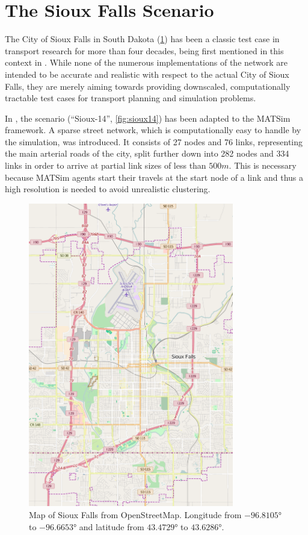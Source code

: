 \section{The Sioux Falls Scenario}
\label{sec:sioux}

The City of Sioux Falls in South Dakota (\cref{fig:original_map}) has been a classic test case in transport
research for more than four decades, being first mentioned in this context in
\citet{Morlok1973}. While none of the numerous implementations of the network are intended to be accurate
and realistic with respect to the actual City of Sioux Falls, they are merely aiming
towards providing downscaled, computationally tractable test cases for transport
planning and simulation problems.

In \citet{Chakirov2014}, the scenario (``Sioux-14'', \cref{fig:sioux14}) has been
adapted to the MATSim framework. A sparse street network, which is computationally
easy to handle by the simulation, was introduced. It consists of 27 nodes and 76 links,
representing the main arterial roads of the city, split further down into
282 nodes and 334 links in order to arrive at partial link sizes of less than $500m$.
This is necessary because MATSim agents start their travels at the start node
of a link and thus a high resolution is needed to avoid unrealistic clustering.

\begin{figure}
    \centering
    \includegraphics[width=0.8\textwidth]{figures/original_map.pdf}
    \caption{Map of Sioux Falls from OpenStreetMap. Longitude from $-96.8105°$ to $-96.6653°$ and latitude from $43.4729°$ to $43.6286°$.}
    \label{fig:original_map}
\end{figure}

